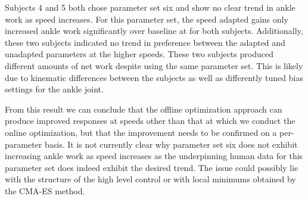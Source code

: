 Subjects 4 and 5 both chose parameter set six and show no clear trend in ankle
work as speed increases. For this parameter set, the speed adapted gains only
increased ankle work significantly over baseline at  for
both subjects. Additionally, these two subjects indicated no trend in
preference between the adapted and unadapted parameters at the higher speeds.
These two subjects produced different amounts of net work despite using the same
parameter set. This is likely due to kinematic differences between the subjects
as well as differently tuned bias settings for the ankle joint.

From this result we can conclude that the offline optimization approach can
produce improved responses at speeds other than that at which we conduct the
online optimization, but that the improvement needs to be confirmed on a
per-parameter basis. It is not currently clear why parameter set six does not
exhibit increasing ankle work as speed increases as the underpinning human data
for this parameter set does indeed exhibit the desired trend. The issue could
possibly lie with the structure of the high level control or with local minimums
obtained by the CMA-ES method. 
